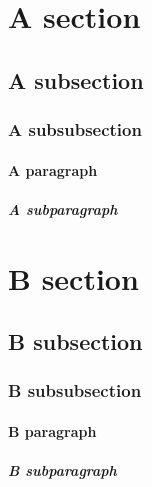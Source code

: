 \documentclass[11pt]{article}
\begin{document}
\tableofcontents

\section{A section}
\subsection{A subsection}
\subsubsection{A subsubsection}
\paragraph{A paragraph}
\subparagraph{A subparagraph}

\section{B section}
\subsection{B subsection}
\subsubsection{B subsubsection}
\paragraph{B paragraph}
\subparagraph{B subparagraph}
\end{document}
